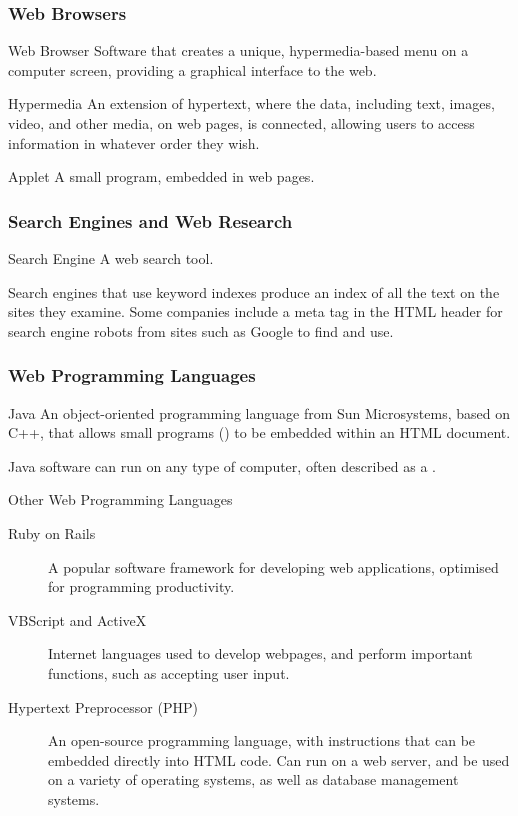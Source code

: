 \documentclass[\main/notes.tex]{subfiles}
\begin{document}
				\subsubsection{Web Browsers}
					\begin{definition}{Web Browser}
						Software that creates a unique, hypermedia-based menu on a computer screen, providing a graphical interface to the web.
					\end{definition}
					\begin{definition}{Hypermedia}
						An extension of hypertext, where the data, including text, images, video, and other media, on web pages, is connected, allowing users to access information in whatever order they wish.
					\end{definition}
					\begin{definition}{Applet}
						A small program, embedded in web pages.
					\end{definition}
				\subsubsection{Search Engines and Web Research}
					\begin{definition}{Search Engine}
						A web search tool.

						Search engines that use keyword indexes produce an index of all the text on the sites they examine. Some companies include a meta tag in the HTML header for search engine robots from sites such as Google to find and use. 
					\end{definition}
				\subsubsection{Web Programming Languages}
					\begin{definition}{Java}
						An object-oriented programming language from Sun Microsystems, based on C++, that allows small programs () to be embedded within an HTML document.

						Java software can run on any type of computer, often described as a .
					\end{definition}
					\begin{sidenote}{Other Web Programming Languages}
						\begin{description}
							\item[Ruby on Rails] A popular software framework for developing web applications, optimised for programming productivity.
							\item[VBScript and ActiveX] Internet languages used to develop webpages, and perform important functions, such as accepting user input.
							\item[Hypertext Preprocessor (PHP)] An open-source programming language, with instructions that can be embedded directly into HTML code. Can run on a web server, and be used on a variety of operating systems, as well as database management systems.
						\end{description}
					\end{sidenote}
\end{document}
